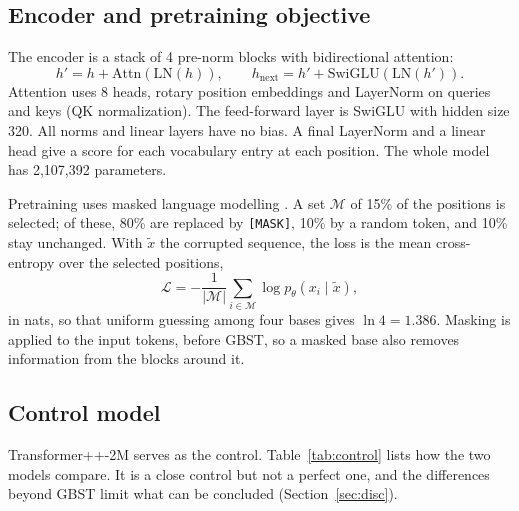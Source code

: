 \documentclass{article}
\begin{document}
\subsection{Encoder and pretraining objective}

The encoder is a stack of 4 pre-norm blocks with bidirectional attention:
\begin{equation}
  h' = h + \mathrm{Attn}(\mathrm{LN}(h)),\qquad h_{\text{next}} = h' + \mathrm{SwiGLU}(\mathrm{LN}(h')).
\end{equation}
Attention uses 8 heads, rotary position embeddings \citep{su2024roformer} and LayerNorm on queries
and keys (QK normalization). The feed-forward layer is SwiGLU \citep{shazeer2020glu} with hidden size
320. All norms and linear layers have no bias. A final LayerNorm and a linear head give a score for
each vocabulary entry at each position. The whole model has 2,107,392 parameters.

Pretraining uses masked language modelling \citep{devlin2019bert}. A set $\mathcal{M}$ of 15\% of the
positions is selected; of these, 80\% are replaced by \texttt{[MASK]}, 10\% by a random token, and 10\%
stay unchanged. With $\tilde x$ the corrupted sequence, the loss is the mean cross-entropy over the selected
positions,
\begin{equation}
  \mathcal{L} = -\frac{1}{|\mathcal{M}|}\sum_{i\in\mathcal{M}} \log p_\theta(x_i\mid\tilde x),
\end{equation}
in nats, so that uniform guessing among four bases gives $\ln 4 = 1.386$. Masking is applied to the
input tokens, before GBST, so a masked base also removes information from the blocks around it.

\subsection{Control model}\label{sec:control}

Transformer++-2M \citep[Table A3]{schmidinger2024bioxlstm} serves as the control. Table~\ref{tab:control}
lists how the two models compare. It is a close control but not a perfect one, and the differences
beyond GBST limit what can be concluded (Section~\ref{sec:disc}).
\end{document}
